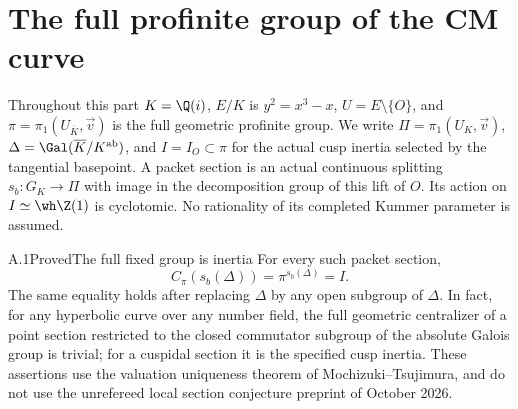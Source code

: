 \section{The full profinite group of the CM curve}
\label{part:A}

Throughout this part $K=\Q(i)$, $E/K$ is $y^2=x^3-x$,
$U=E\setminus\{O\}$, and $\pi=\pi_1(U_{\overline K},\vec v)$ is
the full geometric profinite group. We write $\Pi=\pi_1(U_K,\vec v)$,
$\Delta=\Gal(\overline K/K^{\rm ab})$, and $I=I_O\subset\pi$ for
the actual cusp inertia selected by the tangential basepoint. A packet section
is an actual continuous splitting $s_b:G_K\to\Pi$ with image in the
decomposition group of this lift of $O$. Its action on $I\simeq\wh\Z(1)$
is cyclotomic. No rationality of its completed Kummer parameter is assumed.

\begin{statement}{A.1}{Proved}{The full fixed group is inertia}
For every such packet section,
\[
                 C_\pi(s_b(\Delta))=\pi^{s_b(\Delta)}=I.
\]
The same equality holds after replacing $\Delta$ by any open subgroup of
$\Delta$. In fact, for any hyperbolic curve over any number field, the full
geometric centralizer of a point section restricted to the closed commutator
subgroup of the absolute Galois group is trivial; for a cuspidal section it is
the specified cusp inertia. These assertions use the valuation uniqueness
theorem of Mochizuki--Tsujimura, and do not use the unrefereed local section
conjecture preprint of October 2026.
\end{statement}
